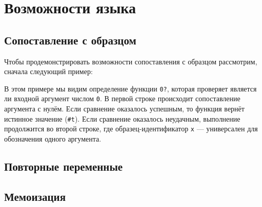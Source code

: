 \section{Возможности языка}
    \subsection{Сопоставление с образцом}
    
    Чтобы продемонстрировать возможности сопоставления с образцом рассмотрим, сначала следующий пример:

    

    В этом примере мы видим определение функции \verb,0?,, которая проверяет является ли входной аргумент числом \verb,0,.
    В первой строке происходит сопоставление аргумента с нулём.
    Если сравнение оказалось успешным, то функция вернёт истинное значение (\verb,#t,).
    Если сравнение оказалось неудачным, выполнение продолжится во второй строке, где образец-идентификатор \verb,x, --- универсален для обозначения одного аргумента.
    \subsection{Повторные переменные}
    \subsection{Мемоизация}
